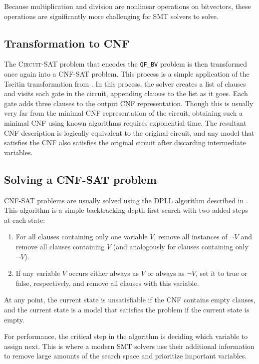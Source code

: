 \documentclass{sig-alternate}
\begin{document}
Because multiplication and division are nonlinear operations on bitvectors,
these operations are significantly more challenging for SMT solvers to
solve.

\subsection{Transformation to CNF}

The \textsc{Circuit-SAT} problem that encodes the \texttt{QF\_BV}
problem is then transformed once again into a CNF-SAT problem.  This
process is a simple application of the Tseitin transformation from
\cite{tseitin}.  In this process, the solver creates a list of clauses
and visits each gate in the circuit, appending clauses to the list
as it goes.  Each gate adds three clauses to the output CNF
representation.  Though this is usually very far from the minimal CNF
representation of the circuit, obtaining such a minimal CNF using
known algorithms requires exponential time.  The resultant CNF
description is logically equivalent to the original circuit, and any
model that satisfies the CNF also satisfies the original circuit
after discarding intermediate variables.

\subsection{Solving a CNF-SAT problem}

CNF-SAT problems are usually solved using the DPLL algorithm described
in \cite{dpll}.  This algorithm is a simple backtracking depth first
search with two added steps at each state:

\begin{enumerate}
    \item For all clauses containing only one variable $V$, remove
        all instances of $\neg V$ and remove all clauses containing
        $V$ (and analogously for clauses containing only $\neg V$).
    \item If any variable $V$ occurs either always as $V$ or always
        as $\neg V$, set it to true or false, respectively, and
        remove all clauses with this variable.
\end{enumerate}

At any point, the current state is unsatisfiable if the CNF contains
empty clauses, and the current state is a model that satisfies the
problem if the current state is empty.

For performance, the critical step in the algorithm is deciding which
variable to assign next.  This is where a modern SMT solvers use their
additional information to remove large amounts of the search space and
prioritize important variables.
\end{document}
